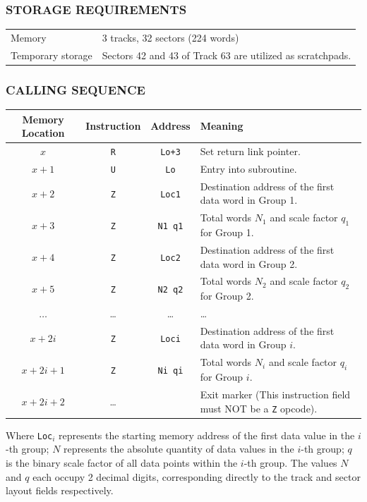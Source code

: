 \subsubsection*{STORAGE REQUIREMENTS}
\begin{center}
\begin{tabular}{ll}
    \toprule
    Memory & 3 tracks, 32 sectors (224 words) \\
    Temporary storage    & Sectors 42 and 43 of Track 63 are utilized as scratchpads. \\
    \bottomrule
\end{tabular}
\end{center}

\subsubsection*{CALLING SEQUENCE}
\begin{table}[h!]
\centering
\begin{tabularx}{\textwidth}{cccX}
\toprule
\textbf{Memory Location} & \textbf{Instruction} & \textbf{Address} & \textbf{Meaning} \\
\midrule
$x$               & \texttt{R}      & \texttt{Lo+3}    & Set return link pointer. \\
$x+1$             & \texttt{U}      & \texttt{Lo}      & Entry into subroutine. \\
$x+2$             & \texttt{Z}      & \texttt{Loc1}    & Destination address of the first data word in Group 1. \\
$x+3$             & \texttt{Z}      & \texttt{N1 q1}   & Total words $N_1$ and scale factor $q_1$ for Group 1. \\
$x+4$             & \texttt{Z}      & \texttt{Loc2}    & Destination address of the first data word in Group 2. \\
$x+5$             & \texttt{Z}      & \texttt{N2 q2}   & Total words $N_2$ and scale factor $q_2$ for Group 2. \\
$\dots$           & \dots           & \dots            & \dots \\
$x+2i$            & \texttt{Z}      & \texttt{Loci}    & Destination address of the first data word in Group $i$. \\
$x+2i+1$          & \texttt{Z}      & \texttt{Ni qi}   & Total words $N_i$ and scale factor $q_i$ for Group $i$. \\
$x+2i+2$          & \dots           &                  & Exit marker (This instruction field must NOT be a \texttt{Z} opcode). \\
\bottomrule
\end{tabularx}
\end{table}
Where \texttt{Loc}$_i$ represents the starting memory address of the first data value in the $i$-th group; $N$ represents the absolute quantity of data values in the $i$-th group; $q$ is the binary scale factor of all data points within the $i$-th group. The values $N$ and $q$ each occupy 2 decimal digits, corresponding directly to the track and sector layout fields respectively.

